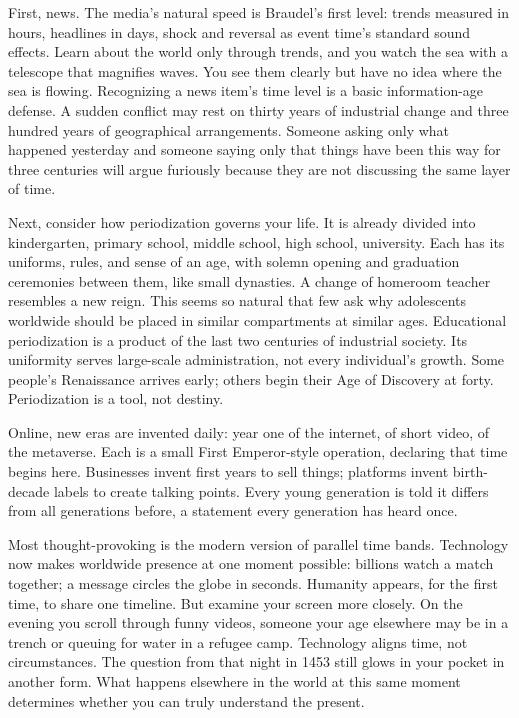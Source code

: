 First, news. The media's natural speed is Braudel's first level: trends measured in hours, headlines in days, shock and reversal as event time's standard sound effects. Learn about the world only through trends, and you watch the sea with a telescope that magnifies waves. You see them clearly but have no idea where the sea is flowing. Recognizing a news item's time level is a basic information-age defense. A sudden conflict may rest on thirty years of industrial change and three hundred years of geographical arrangements. Someone asking only what happened yesterday and someone saying only that things have been this way for three centuries will argue furiously because they are not discussing the same layer of time.

Next, consider how periodization governs your life. It is already divided into kindergarten, primary school, middle school, high school, university. Each has its uniforms, rules, and sense of an age, with solemn opening and graduation ceremonies between them, like small dynasties. A change of homeroom teacher resembles a new reign. This seems so natural that few ask why adolescents worldwide should be placed in similar compartments at similar ages. Educational periodization is a product of the last two centuries of industrial society. Its uniformity serves large-scale administration, not every individual's growth. Some people's Renaissance arrives early; others begin their Age of Discovery at forty. Periodization is a tool, not destiny.

Online, new eras are invented daily: year one of the internet, of short video, of the metaverse. Each is a small First Emperor-style operation, declaring that time begins here. Businesses invent first years to sell things; platforms invent birth-decade labels to create talking points. Every young generation is told it differs from all generations before, a statement every generation has heard once.

Most thought-provoking is the modern version of parallel time bands. Technology now makes worldwide presence at one moment possible: billions watch a match together; a message circles the globe in seconds. Humanity appears, for the first time, to share one timeline. But examine your screen more closely. On the evening you scroll through funny videos, someone your age elsewhere may be in a trench or queuing for water in a refugee camp. Technology aligns time, not circumstances. The question from that night in 1453 still glows in your pocket in another form. What happens elsewhere in the world at this same moment determines whether you can truly understand the present.

